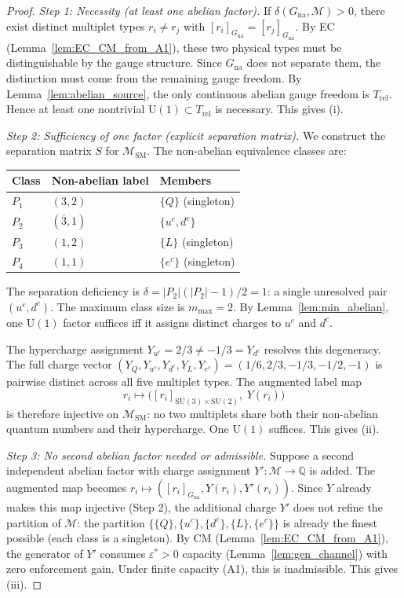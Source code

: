 \documentclass[11pt,a4paper]{article}
\theoremstyle{definition}
\newcommand{\SU}{\mathrm{SU}}
\newcommand{\U}{\mathrm{U}}
\begin{document}
\begin{proof}
\textit{Step 1: Necessity (at least one abelian factor).}\quad
If $\delta(G_{\mathrm{na}}, \mathcal{M}) > 0$, there exist
distinct multiplet types $r_i \ne r_j$ with
$[r_i]_{G_{\mathrm{na}}} = [r_j]_{G_{\mathrm{na}}}$.  By EC
(Lemma~\ref{lem:EC_CM_from_A1}), these two physical
types must be distinguishable by the gauge structure.
Since $G_{\mathrm{na}}$ does not separate them, the distinction must
come from the remaining gauge freedom.  By
Lemma~\ref{lem:abelian_source}, the only continuous abelian gauge
freedom is $T_{\mathrm{rel}}$.  Hence at least one nontrivial
$\U(1) \subset T_{\mathrm{rel}}$ is necessary.  This gives (i).

\textit{Step 2: Sufficiency of one factor (explicit separation matrix).}\quad
We construct the separation matrix $S$ for
$\mathcal{M}_{\mathrm{SM}}$.  The non-abelian equivalence classes are:
\begin{center}\small
\begin{tabular}{@{}lll@{}}
\toprule
\textbf{Class} & \textbf{Non-abelian label} & \textbf{Members} \\
\midrule
$P_1$ & $(3, 2)$ & $\{Q\}$ (singleton) \\
$P_2$ & $(\bar{3}, 1)$ & $\{u^c, d^c\}$ \\
$P_3$ & $(1, 2)$ & $\{L\}$ (singleton) \\
$P_4$ & $(1, 1)$ & $\{e^c\}$ (singleton) \\
\bottomrule
\end{tabular}
\end{center}
The separation deficiency is $\delta = |P_2|(|P_2| - 1)/2 = 1$:
a single unresolved pair $(u^c, d^c)$.  The maximum class size is
$m_{\max} = 2$.  By Lemma~\ref{lem:min_abelian}, one $\U(1)$ factor
suffices iff it assigns distinct charges to $u^c$ and $d^c$.

The hypercharge assignment $Y_{u^c} = 2/3 \ne -1/3 = Y_{d^c}$
resolves this degeneracy.  The full charge vector
$(Y_Q, Y_{u^c}, Y_{d^c}, Y_L, Y_{e^c}) = (1/6, 2/3, -1/3, -1/2, -1)$
is pairwise distinct across all five multiplet types.  The augmented
label map
\[
  r_i \mapsto \bigl([r_i]_{\SU(3) \times \SU(2)},\; Y(r_i)\bigr)
\]
is therefore injective on $\mathcal{M}_{\mathrm{SM}}$: no two
multiplets share both their non-abelian quantum numbers and their
hypercharge.  One $\U(1)$ suffices.  This gives (ii).

\textit{Step 3: No second abelian factor needed or admissible.}\quad
Suppose a second independent abelian factor with charge assignment
$Y': \mathcal{M} \to \mathbb{Q}$ is added.  The augmented map
becomes $r_i \mapsto ([r_i]_{G_{\mathrm{na}}}, Y(r_i), Y'(r_i))$.
Since $Y$ already makes this map injective (Step 2), the additional
charge $Y'$ does not refine the partition of $\mathcal{M}$: the
partition $\{\{Q\}, \{u^c\}, \{d^c\}, \{L\}, \{e^c\}\}$ is already
the finest possible (each class is a singleton).  By CM
(Lemma~\ref{lem:EC_CM_from_A1}), the generator of $Y'$ consumes
$\varepsilon^* > 0$ capacity (Lemma~\ref{lem:gen_channel}) with zero
enforcement gain.  Under finite capacity (A1), this is inadmissible.
This gives (iii).


\end{proof}
\end{document}
